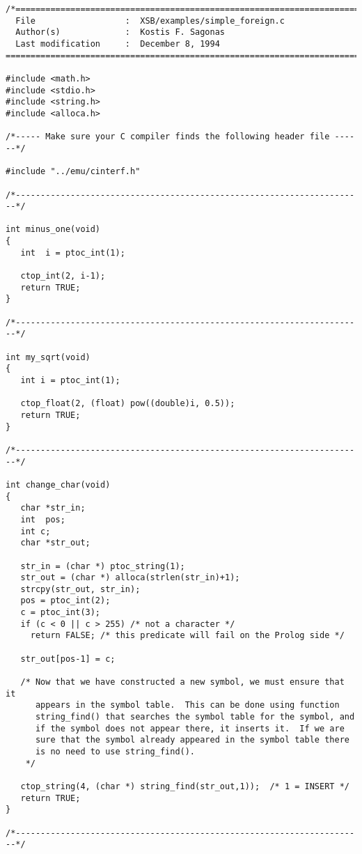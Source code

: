 \begin{small}
\begin{verbatim}
/*======================================================================
  File                  :  XSB/examples/simple_foreign.c
  Author(s)             :  Kostis F. Sagonas
  Last modification     :  December 8, 1994
========================================================================*/

#include <math.h>
#include <stdio.h>
#include <string.h>
#include <alloca.h>

/*----- Make sure your C compiler finds the following header file ------*/

#include "../emu/cinterf.h"

/*----------------------------------------------------------------------*/

int minus_one(void)
{
   int  i = ptoc_int(1);

   ctop_int(2, i-1);
   return TRUE;
}

/*----------------------------------------------------------------------*/

int my_sqrt(void)
{
   int i = ptoc_int(1);

   ctop_float(2, (float) pow((double)i, 0.5));
   return TRUE;
}

/*----------------------------------------------------------------------*/

int change_char(void)
{
   char *str_in;
   int  pos;
   int c;
   char *str_out;

   str_in = (char *) ptoc_string(1);
   str_out = (char *) alloca(strlen(str_in)+1);
   strcpy(str_out, str_in);
   pos = ptoc_int(2);
   c = ptoc_int(3);
   if (c < 0 || c > 255) /* not a character */
     return FALSE; /* this predicate will fail on the Prolog side */

   str_out[pos-1] = c;

   /* Now that we have constructed a new symbol, we must ensure that it
      appears in the symbol table.  This can be done using function
      string_find() that searches the symbol table for the symbol, and
      if the symbol does not appear there, it inserts it.  If we are
      sure that the symbol already appeared in the symbol table there
      is no need to use string_find().
    */

   ctop_string(4, (char *) string_find(str_out,1));  /* 1 = INSERT */
   return TRUE;
}

/*----------------------------------------------------------------------*/
\end{verbatim}
\end{small}

